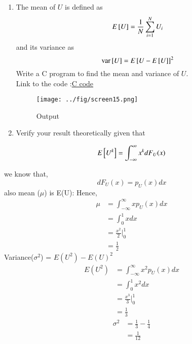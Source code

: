 \documentclass[journal,12pt,twocolumn]{IEEEtran}
\renewcommand\thesection{\arabic{section}}
\begin{document}
\begin{enumerate}[label=\thesection.\arabic*
,ref=\thesection.\theenumi]
\item
The mean of $U$ is defined as
\begin{equation}
E{}\left[U\right] = \frac{1}{N}\sum_{i=1}^{N}U_i
\end{equation}
and its variance as
\begin{equation}
\text{var}{}\left[U\right] = E{}\left[U- E{}\left[U\right]\right]^2 
\end{equation}
Write a C program to  find the mean and variance of $U$.\\

\solution Link to the code :\href{https://github.com/anikettsatpute/Probability-and-Random-Variable-Assignment/blob/main/code/code1_4.c}{C code}

\begin{figure}[h]
\centering
\texttt{[image: ../fig/screen15.png]}
\caption{Output}
\label{fig:gauss_cdf}
\end{figure}

\item Verify your result theoretically given that
\end{enumerate}

\begin{equation}
E{}\left[U^k\right] = \int_{-\infty}^{\infty}x^kdF_{U}(x)
\end{equation}

\solution we know that,
\begin{equation}
dF_{U}(x) = p_U(x)dx
\end{equation}
also mean ($\mu$) is E(U):
Hence,
\begin{align*}
\mu &= \int_{-\infty}^{\infty}xp_{U}(x)dx\\
&= \int_{0}^{1}xdx\\
&= \frac{x^2}{2} \Bigg|^{1}_{0} \\
&= \frac{1}{2}
\end{align*}
Variance($\sigma^{2}$) = $E(U^{2}) - E(U)^{2}$
\begin{align*}
E(U^{2}) &= \int_{-\infty}^{\infty}x^{2}p_{U}(x)dx\\
&= \int_{0}^{1}x^{2}dx\\
&= \frac{x^3}{3} \Bigg|^{1}_{0} \\
&= \frac{1}{3}
\end{align*}
\begin{align*}
\sigma^{2} &= \frac{1}{3} - \frac{1}{4}\\
&= \frac{1}{12}
\end{align*}
\vspace{0.3in}
\end{document}
